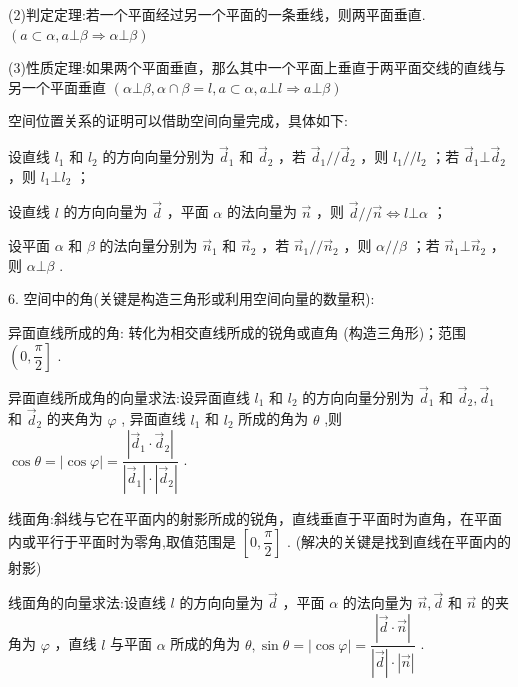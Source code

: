 (2)判定定理:若一个平面经过另一个平面的一条垂线，则两平面垂直. $\left( {a \subset  \alpha ,a\bot \beta  \Rightarrow  \alpha \bot \beta }\right)$

(3)性质定理:如果两个平面垂直，那么其中一个平面上垂直于两平面交线的直线与另一个平面垂直 $\left( {\alpha  \bot  \beta ,\alpha  \cap  \beta  = l,a \subset  \alpha ,a \bot  l \Rightarrow  a \bot  \beta }\right)$

  空间位置关系的证明可以借助空间向量完成，具体如下:

  设直线 ${l}_{1}$ 和 ${l}_{2}$ 的方向向量分别为 ${\overrightarrow{d}}_{1}$ 和 ${\overrightarrow{d}}_{2}$ ，若 ${\overrightarrow{d}}_{1}//{\overrightarrow{d}}_{2}$ ，则 ${l}_{1}//{l}_{2}$ ；若 ${\overrightarrow{d}}_{1}\bot {\overrightarrow{d}}_{2}$ ，则 ${l}_{1}\bot {l}_{2}$ ；

  设直线 $l$ 的方向向量为 $\overrightarrow{d}$ ，平面 $\alpha$ 的法向量为 $\overrightarrow{n}$ ，则 $\overrightarrow{d}//\overrightarrow{n} \Leftrightarrow  l\bot \alpha$ ；

  设平面 $\alpha$ 和 $\beta$ 的法向量分别为 ${\overrightarrow{n}}_{1}$ 和 ${\overrightarrow{n}}_{2}$ ，若 ${\overrightarrow{n}}_{1}//{\overrightarrow{n}}_{2}$ ，则 $\alpha //\beta$ ；若 ${\overrightarrow{n}}_{1}\bot {\overrightarrow{n}}_{2}$ ，则 $\alpha \bot \beta$ .

6. 空间中的角(关键是构造三角形或利用空间向量的数量积):

异面直线所成的角: 转化为相交直线所成的锐角或直角 (构造三角形)；范围 $\left( {0,\dfrac{\pi }{2}}\right\rbrack$ .

  异面直线所成角的向量求法:设异面直线 ${l}_{1}$ 和 ${l}_{2}$ 的方向向量分别为 ${\overrightarrow{d}}_{1}$ 和 ${\overrightarrow{d}}_{2},{\overrightarrow{d}}_{1}$ 和 ${\overrightarrow{d}}_{2}$ 的夹角为 $\varphi$ , 异面直线 ${l}_{1}$ 和 ${l}_{2}$ 所成的角为 $\theta$ ,则 $\cos \theta  = \left| {\cos \varphi }\right|  = \dfrac{\left| {\overrightarrow{d}}_{1} \cdot  {\overrightarrow{d}}_{2}\right| }{\left| {\overrightarrow{d}}_{1}\right|  \cdot  \left| {\overrightarrow{d}}_{2}\right| }$ .

线面角:斜线与它在平面内的射影所成的锐角，直线垂直于平面时为直角，在平面内或平行于平面时为零角,取值范围是 $\left\lbrack  {0,\dfrac{\pi }{2}}\right\rbrack$ . (解决的关键是找到直线在平面内的射影)

   线面角的向量求法:设直线 $l$ 的方向向量为 $\overrightarrow{d}$ ，平面 $\alpha$ 的法向量为 $\overrightarrow{n},\overrightarrow{d}$ 和 $\overrightarrow{n}$ 的夹角为 $\varphi$ ，直线 $l$ 与平面 $\alpha$ 所成的角为 $\theta ,\sin \theta  = \left| {\cos \varphi }\right|  = \dfrac{\left| \overrightarrow{d} \cdot  \overrightarrow{n}\right| }{\left| \overrightarrow{d}\right|  \cdot  \left| \overrightarrow{n}\right| }$ .

